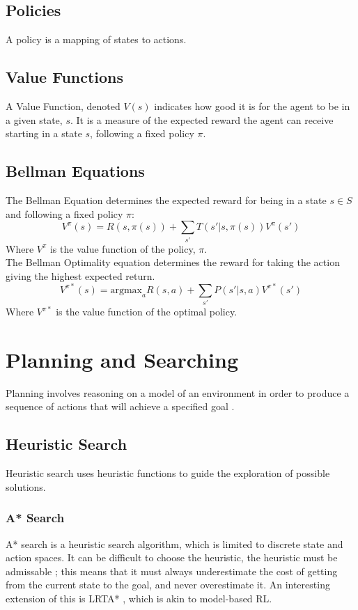 \subsection{Policies}
A policy is a mapping of states to actions.
\subsection{Value Functions}
A Value Function, denoted $V(s)$ indicates how good it is for the agent to be in a given state, $s$. It is a measure of the expected reward the agent can receive starting in a state $s$, following a fixed policy $\pi$.
\subsection{Bellman Equations}The Bellman Equation determines the expected reward for being in a state $s \in S$ and following a fixed policy $\pi$:
$$V^\pi(s) = R(s, \pi(s)) + \sum_{s'}T(s'|s,\pi(s))V^\pi(s')$$
Where $V^\pi$ is the value function of the policy, $\pi$.\\
The Bellman Optimality equation determines the reward for taking the action giving the highest expected return.
$$V^{\pi*}(s) = \text{argmax}_a{R(s,a) + \sum_{s'}P(s'|s,a)V^{\pi*}(s')}$$
Where $V^{\pi*}$ is the value function of the optimal policy.

\section{Planning and Searching}
Planning involves reasoning on a model of an environment in order to produce a sequence of actions that will achieve a specified goal \cite{DBLP:books/aw/RN2020, Lav06, GhallabNauTraverso04}.
\subsection{Heuristic Search}
Heuristic search uses heuristic functions to guide the exploration of possible solutions.
\subsubsection{A* Search}
A* search is a heuristic search algorithm, which is limited to discrete state and action spaces. It can be difficult to choose the heuristic, the heuristic must be admissable \cite{DBLP:books/aw/RN2020}; this means that it must always underestimate the cost of getting from the current state to the goal, and never overestimate it. An interesting extension of this is LRTA* \cite{KORF1990189}, which is akin to model-based RL.
